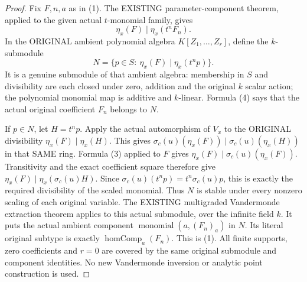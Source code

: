\begin{proof}
Fix $F,n,a$ as in (1). The EXISTING parameter-component theorem,
applied to the given actual $t$-monomial family, gives
\[
 \eta_x(F)\mid\eta_x(t^nF_n).
 \tag{4}
\]
In the ORIGINAL ambient polynomial algebra $K[Z_1,\ldots,Z_r]$,
define the $k$-submodule
\[
 N=\{p\in S:\ \eta_x(F)\mid\eta_x(t^np)\}.
\]
It is a genuine submodule of that ambient algebra: membership in $S$
and divisibility are each closed under zero, addition and the original
$k$ scalar action; the polynomial monomial map is additive and
$k$-linear. Formula (4) says that the actual original coefficient
$F_n$ belongs to $N$.

If $p\in N$, let $H=t^np$. Apply the actual automorphism of $V_x$
to the ORIGINAL divisibility $\eta_x(F)\mid\eta_x(H)$. This gives
$\sigma_c(u)(\eta_x(F))\mid\sigma_c(u)(\eta_x(H))$ in that SAME ring.
Formula (3) applied to $F$ gives
$\eta_x(F)\mid\sigma_c(u)(\eta_x(F))$. Transitivity and the exact
coefficient square therefore give
$\eta_x(F)\mid\eta_x(\sigma_c(u)H)$.
Since $\sigma_c(u)(t^np)=t^n\sigma_c(u)p$, this is exactly the
required divisibility of the scaled monomial. Thus $N$ is stable under
every nonzero scaling of each original variable. The EXISTING
multigraded Vandermonde extraction theorem applies to this actual
submodule, over the infinite field $k$. It puts the actual ambient
component $\operatorname{monomial}(a,(F_n)_a)$ in $N$.
Its literal original subtype is exactly
$\operatorname{homComp}_a(F_n)$. This is (1).
All finite supports, zero coefficients and $r=0$ are covered by the
same original submodule and component identities. No new
Vandermonde inversion or analytic point construction is used.
\end{proof}

